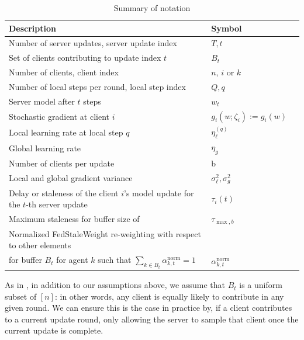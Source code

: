 \documentclass{article}
\begin{document}
\begin{table}
  \caption{Summary of notation}
  \label{sample-table}
  \centering
  \begin{tabular}{lll}
    \toprule                
    Description     & Symbol \\
    \midrule
    Number of server updates, server update index &  $T, t$  \\
   Set of clients contributing to update index $t$ &  $B_t$  \\
   Number of clients, client index & $n$, $i$ or $k$ \\
   Number of local steps per round, local step index & $Q, q$ \\
   Server model after $t$ steps & $w_t$ \\
   Stochastic gradient at client $i$ & $g_i (w; \zeta_i) := g_i(w)$ \\
   Local learning rate at local step $q$ & $\eta_{\ell}^{(q)}$ \\
   Global learning rate & $\eta_g$ \\
   Number of clients per update & b \\
   Local and global gradient variance & $\sigma_\ell^2, \sigma_g^2$ \\
   Delay or staleness of the client $i$'s model update for the $t$-th server update & $\tau_i(t)$ \\
   Maximum staleness for buffer size of & $\tau_{\max, b}$ \\
   Normalized FedStaleWeight re-weighting with respect to other elements \\ for buffer $B_t $ for agent $k$ such that $\sum_{k \in B_t}{\alpha^{\text{norm}}_{k, t}} = 1$ & $\alpha^{\text{norm}}_{k, t}$ \\
    \bottomrule
  \end{tabular}
\end{table}

As in \cite{nguyen2022federated}, in addition to our assumptions above, we assume that $B_t$ is a uniform subset of $[n]$: in other words, any client is equally likely to contribute in any given round. We can ensure this is the case in practice by, if a client contributes to a current update round, only allowing the server to sample that client once the current update is complete.
\end{document}
